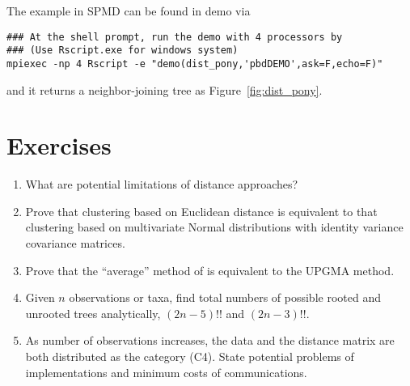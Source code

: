 The example in SPMD can be found in demo via
\begin{lstlisting}
### At the shell prompt, run the demo with 4 processors by
### (Use Rscript.exe for windows system)
mpiexec -np 4 Rscript -e "demo(dist_pony,'pbdDEMO',ask=F,echo=F)"
\end{lstlisting}
and it returns a neighbor-joining tree as Figure~\ref{fig:dist_pony}.



\section{Exercises}
\label{sec:pairwise_exercise}

\begin{enumerate}[label=\thechapter-\arabic*]

\item
What are potential limitations of distance approaches?

\item
Prove that clustering based on Euclidean distance is equivalent to that
clustering based on multivariate Normal distributions with identity variance
covariance matrices.

\item
Prove that the ``average'' method of  is equivalent to the
UPGMA method.

\item
Given $n$ observations or taxa, find total numbers of possible rooted and
unrooted trees analytically, $(2n-5)!!$ and $(2n-3)!!$.

\item
As number of observations increases, the data and the distance matrix are
both distributed as the category (C4). State potential problems of
implementations and minimum costs of communications.

\end{enumerate}

